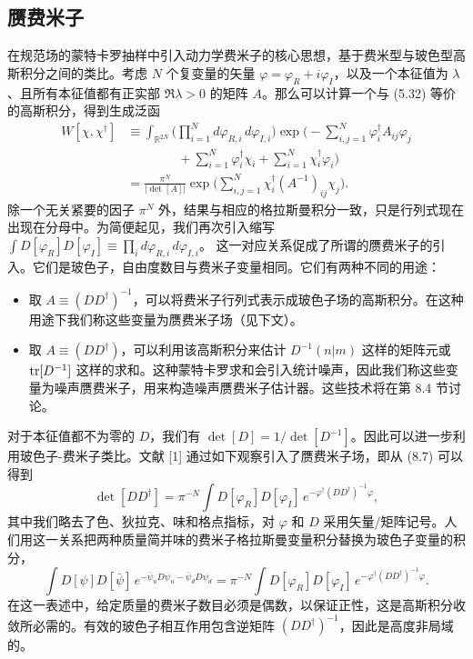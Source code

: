 \subsection{赝费米子}

在规范场的蒙特卡罗抽样中引入动力学费米子的核心思想，基于费米型与玻色型高斯积分之间的类比。考虑 $N$ 个复变量的矢量 $\varphi = \varphi_R + i\varphi_I$，以及一个本征值为 $\lambda$、且所有本征值都有正实部 $\Re\lambda > 0$ 的矩阵 $A$。那么可以计算一个与 (5.32) 等价的高斯积分，得到生成泛函
\begin{equation}
\begin{split}
W[\chi,\chi^\dagger] &\equiv \int_{\mathbb{R}^{2N}}\Big(\prod_{i=1}^{N}d\varphi_{R,i}\,d\varphi_{I,i}\Big)
\exp\Big(-\sum_{i,j=1}^{N}\varphi_i^\dagger A_{ij}\varphi_j\\
&\qquad\qquad + \sum_{i=1}^{N}\varphi_i^\dagger\chi_i + \sum_{i=1}^{N}\chi_i^\dagger\varphi_i\Big)\\
&= \frac{\pi^N}{|\det[A]|}\exp\Big(\sum_{i,j=1}^{N}\chi_i^\dagger(A^{-1})_{ij}\chi_j\Big).
\end{split}
\end{equation}
除一个无关紧要的因子 $\pi^N$ 外，结果与相应的格拉斯曼积分一致，只是行列式现在出现在分母中。为简便起见，我们再次引入缩写
$\int D[\varphi_R]D[\varphi_I] \equiv \prod_i d\varphi_{R,i}\,d\varphi_{I,i}$。
这一对应关系促成了所谓的赝费米子的引入。它们是玻色子，自由度数目与费米子变量相同。它们有两种不同的用途：
\begin{itemize}
  \item 取 $A \equiv (DD^\dagger)^{-1}$，可以将费米子行列式表示成玻色子场的高斯积分。在这种用途下我们称这些变量为赝费米子场（见下文）。
  \item 取 $A \equiv (DD^\dagger)$，可以利用该高斯积分来估计 $D^{-1}(n|m)$ 这样的矩阵元或 $\operatorname{tr}[D^{-1}]$ 这样的求和。这种蒙特卡罗求和会引入统计噪声，因此我们称这些变量为噪声赝费米子，用来构造噪声赝费米子估计器。这些技术将在第 8.4 节讨论。
\end{itemize}

对于本征值都不为零的 $D$，我们有
$\det[D] = 1/\det[D^{-1}]$。因此可以进一步利用玻色子-费米子类比。文献 [1] 通过如下观察引入了赝费米子场，即从 (8.7) 可以得到
\begin{equation}
\det[DD^\dagger] = \pi^{-N}\int D[\varphi_R]D[\varphi_I]\,e^{-\varphi^\dagger(DD^\dagger)^{-1}\varphi},
\end{equation}
其中我们略去了色、狄拉克、味和格点指标，对 $\varphi$ 和 $D$ 采用矢量/矩阵记号。人们用这一关系把两种质量简并味的费米子格拉斯曼变量积分替换为玻色子变量的积分，
\begin{equation}
\int D[\psi]D[\bar{\psi}]\,e^{-\bar{\psi}_u D\psi_u - \bar{\psi}_d D\psi_d}
= \pi^{-N}\int D[\varphi_R]D[\varphi_I]\,e^{-\varphi^\dagger(DD^\dagger)^{-1}\varphi}.
\end{equation}
在这一表述中，给定质量的费米子数目必须是偶数，以保证正性，这是高斯积分收敛所必需的。有效的玻色子相互作用包含逆矩阵 $(DD^\dagger)^{-1}$，因此是高度非局域的。

